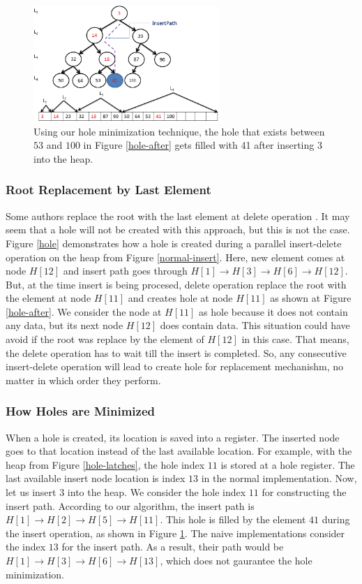 \begin{figure}[!ht]
  \centering
  \includegraphics[width=7cm]{fig/fillhole.png}
      \caption{Using our hole minimization technique, the hole that exists between $53$ and $100$ in Figure \ref{hole-after} gets filled with 41 after inserting $3$ into the heap.}
    \label{fillhole}
\end{figure}

\subsubsection{Root Replacement by Last Element}
Some authors replace the root with the last element at delete operation \cite{hw2,hw3}. 
It may seem that a hole will not be created with this approach, but this is not the case. Figure \ref{hole} demonstrates how a hole is created during a parallel insert-delete operation on the heap from Figure \ref{normal-insert}.  Here, new element comes at node $H[12]$ and insert path goes through $H[1] \rightarrow H[3] \rightarrow  H[6] \rightarrow  H[12]$. But, at the time insert is being procesed, delete operation replace the root with the element at node $H[11]$ and creates hole at node $H[11]$ as shown at Figure \ref{hole-after}. We consider the node at $H[11]$ as hole because it does not contain any data, but its next node $H[12]$ does contain data. This situation could have avoid if the root was replace by the element of $H[12]$ in this case. That means, the delete operation has to wait till the insert is completed. So, any consecutive insert-delete operation will lead to create hole for replacement mechanishm, no matter in which order they perform.

\subsubsection{How Holes are Minimized} 
When a hole is created, its location is saved into a register. 
The inserted node goes to that location instead of the last available location. 
For example, with the heap from Figure \ref{hole-latches}, the hole index $11$ is stored at a hole register. 
The last available insert node location is index $13$ in the normal implementation. 
Now, let us insert $3$ into the heap. 
We consider the hole index $11$ for constructing the insert path. 
According to our algorithm, the insert path is $H[1] \rightarrow H[2] \rightarrow H[5] \rightarrow H[11]$. 
This hole is filled by the element $41$ during the insert operation, as shown in Figure \ref{fillhole}. 
The naive implementations consider the index $13$ for the insert path.
As a result, their path would be $H[1] \rightarrow H[3] \rightarrow H[6] \rightarrow H[13]$, which does not gaurantee the hole minimization.


